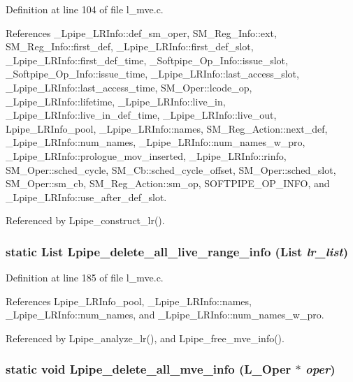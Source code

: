 Definition at line 104 of file l\_\-mve.c.

References \_\-Lpipe\_\-LRInfo::def\_\-sm\_\-oper, SM\_\-Reg\_\-Info::ext, SM\_\-Reg\_\-Info::first\_\-def, \_\-Lpipe\_\-LRInfo::first\_\-def\_\-slot, \_\-Lpipe\_\-LRInfo::first\_\-def\_\-time, \_\-Softpipe\_\-Op\_\-Info::issue\_\-slot, \_\-Softpipe\_\-Op\_\-Info::issue\_\-time, \_\-Lpipe\_\-LRInfo::last\_\-access\_\-slot, \_\-Lpipe\_\-LRInfo::last\_\-access\_\-time, SM\_\-Oper::lcode\_\-op, \_\-Lpipe\_\-LRInfo::lifetime, \_\-Lpipe\_\-LRInfo::live\_\-in, \_\-Lpipe\_\-LRInfo::live\_\-in\_\-def\_\-time, \_\-Lpipe\_\-LRInfo::live\_\-out, Lpipe\_\-LRInfo\_\-pool, \_\-Lpipe\_\-LRInfo::names, SM\_\-Reg\_\-Action::next\_\-def, \_\-Lpipe\_\-LRInfo::num\_\-names, \_\-Lpipe\_\-LRInfo::num\_\-names\_\-w\_\-pro, \_\-Lpipe\_\-LRInfo::prologue\_\-mov\_\-inserted, \_\-Lpipe\_\-LRInfo::rinfo, SM\_\-Oper::sched\_\-cycle, SM\_\-Cb::sched\_\-cycle\_\-offset, SM\_\-Oper::sched\_\-slot, SM\_\-Oper::sm\_\-cb, SM\_\-Reg\_\-Action::sm\_\-op, SOFTPIPE\_\-OP\_\-INFO, and \_\-Lpipe\_\-LRInfo::use\_\-after\_\-def\_\-slot.

Referenced by Lpipe\_\-construct\_\-lr().
\subsubsection{\setlength{\rightskip}{0pt plus 5cm}static List Lpipe\_\-delete\_\-all\_\-live\_\-range\_\-info (List {\em lr\_\-list})\hspace{0.3cm}{\tt  [static]}}\label{l__mve_8c_9db1381b8d089a5564206ab6ba6800f1}




Definition at line 185 of file l\_\-mve.c.

References Lpipe\_\-LRInfo\_\-pool, \_\-Lpipe\_\-LRInfo::names, \_\-Lpipe\_\-LRInfo::num\_\-names, and \_\-Lpipe\_\-LRInfo::num\_\-names\_\-w\_\-pro.

Referenced by Lpipe\_\-analyze\_\-lr(), and Lpipe\_\-free\_\-mve\_\-info().
\subsubsection{\setlength{\rightskip}{0pt plus 5cm}static void Lpipe\_\-delete\_\-all\_\-mve\_\-info (L\_\-Oper $\ast$ {\em oper})\hspace{0.3cm}{\tt  [static]}}\label{l__mve_8c_746c620b9309f05bc7a78d8e1ef1f91b}




